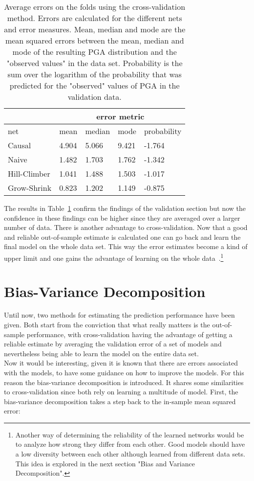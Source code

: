 \begin{table}[h]
\caption[Cross-validation Error]{Average errors on the folds using the cross-validation method. Errors are calculated for the different nets and error measures. Mean, median and mode are the mean squared errors between the mean, median and mode of the resulting PGA distribution and the "observed values" in the data set. Probability is the sum over the logarithm of the probability that was predicted for the "observed" values of PGA in the validation data.}
\centering
\begin{tabular}{ l l l l l  }
 \hline
  & \multicolumn{4}{c}{error metric} \\
 \hline
 net & mean & median & mode & probability\\
 \hline
 Causal   & 4.904    & 5.066  & 9.421   &-1.764\\
 Naive   & 1.482      & 1.703 & 1.762  &-1.342\\
 Hill-Climber   & 1.041      & 1.488 & 1.503  &-1.017\\
 Grow-Shrink   & 0.823     & 1.202  & 1.149 &-0.875\\
\end{tabular}
\label{tab:crossvalidation}
\end{table}

The results in Table~\ref{tab:crossvalidation} confirm the findings of the validation section but now the confidence in these findings can be higher since they are averaged over a larger number of data. There is another advantage to cross-validation. Now that a good and reliable out-of-sample estimate is calculated one can go back and learn the final model on the whole data set. This way the error estimates become a kind of upper limit and one gains the advantage of learning on the whole data~\citep{LearningFromData}.\footnote{Another way of determining the reliability of the learned networks would be to analyze how strong they differ from each other. Good models should have a low diversity between each other although learned from different data sets. This idea is explored in the next section "Bias and Variance Decomposition".}

\section{Bias-Variance Decomposition}

Until now, two methods for estimating the prediction performance have been given. Both start from the conviction that what really matters is the out-of-sample performance, with cross-validation having the advantage of getting a reliable estimate by averaging the validation error of a set of models and nevertheless being able to learn the model on the entire data set.\\
Now it would be interesting, given it is known that there are errors associated with the models, to have some guidance on how to improve the models. For this reason the bias-variance decomposition is introduced. It shares some similarities to cross-validation since both rely on learning a multitude of model. First, the bias-variance decomposition takes a step back to the in-sample mean squared error:

